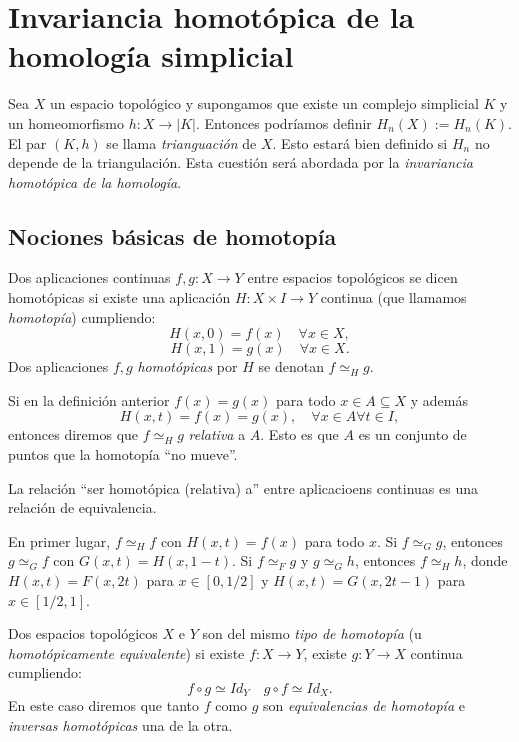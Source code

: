 \documentclass[HS.tex]{subfiles}
\begin{document}
\chapter{Invariancia homotópica de la homología simplicial}


Sea $X$ un espacio topológico y supongamos que existe un complejo simplicial $K$ y un homeomorfismo $h \colon X \to |K|$.
Entonces podríamos definir $H_n(X) := H_n(K)$.
El par $(K,h)$ se llama \emph{trianguación} de $X$.
Esto estará bien definido si $H_n$ no depende de la triangulación.
Esta cuestión será abordada por la \emph{invariancia homotópica de la homología}.

\section{Nociones básicas de homotopía}

\begin{defi}\label{homotopia}
Dos aplicaciones continuas $f,g \colon X \to Y$ entre espacios topológicos se dicen homotópicas si existe una aplicación $H \colon X \times I \to Y$ continua (que llamamos \emph{homotopía}) cumpliendo:
\[ H(x,0) = f(x) \quad \forall x \in X, \]
\[ H(x,1) = g(x) \quad \forall x \in X. \]
Dos aplicaciones $f,g$ \emph{homotópicas} por $H$ se denotan $f \simeq_H g$. 
\end{defi}

\begin{defi}
Si en la definición anterior $f(x) = g(x)$ para todo $x \in A \subseteq X$ y además
\[ H(x,t) = f(x) = g(x),\quad \forall x \in A \forall t \in I, \]
entonces diremos que $f \simeq_H g$ \emph{relativa} a $A$.
Esto es que $A$ es un conjunto de puntos que la homotopía ``no mueve''.
\end{defi}

\begin{prop}
La relación ``ser homotópica (relativa) a'' entre aplicacioens continuas es una relación de equivalencia.
\end{prop}
\begin{dem}
En primer lugar, $f\simeq_H f$ con $H(x,t)=f(x)$ para todo $x$. Si $f\simeq_G g$, entonces $g\simeq_G f$ con $G(x,t)=H(x,1-t)$. Si $f\simeq_F g$ y $g\simeq_G h$, entonces $f\simeq_H h$, donde $H(x,t)=F(x,2t)$ para  $x\in [0,1/2]$ y $H(x,t)=G(x,2t-1)$ para $x\in [1/2,1]$.\QED
\end{dem}

\begin{defi}
Dos espacios topológicos $X$ e $Y$ son del mismo \emph{tipo de homotopía} (u \emph{homotópicamente equivalente}) si existe $f \colon X \to Y$, existe $g \colon Y \to X$ continua cumpliendo:
\[ f \circ g \simeq Id_Y \quad g \circ f \simeq Id_X. \]
En este caso diremos que tanto $f$ como $g$ son \emph{equivalencias de homotopía} e \emph{inversas homotópicas} una de la otra.
\end{defi}
\end{document}
